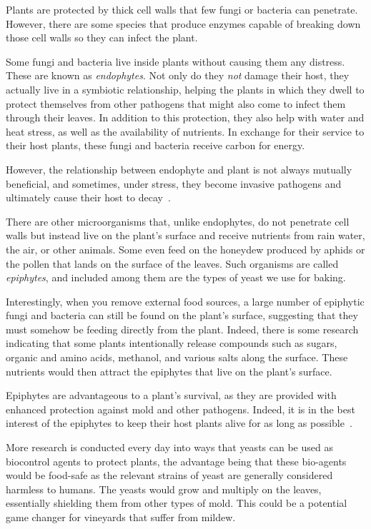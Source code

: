 Plants are protected by thick cell walls that few fungi or bacteria can
penetrate. However, there are some species that produce enzymes capable of
breaking down those cell walls so they can infect the plant.

Some fungi and bacteria live inside plants without causing them any distress.
These are known as \emph{endophytes}. Not only do they \emph{not} damage their
host, they actually live in a symbiotic relationship, helping the plants in
which they dwell to protect themselves from other pathogens that might also
come to infect them through their leaves. In addition to this protection, they
also help with water and heat stress, as well as the availability of nutrients.
In exchange for their service to their host plants, these fungi and bacteria
receive carbon for energy.

However, the relationship between endophyte and plant is not always mutually
beneficial, and sometimes, under stress, they become invasive pathogens and
ultimately cause their host to decay~\cite{endophytes+in+plants}.

There are other microorganisms that, unlike endophytes, do not penetrate cell
walls but instead live on the plant's surface and receive nutrients from rain
water, the air, or other animals. Some even feed on the honeydew produced by
aphids or the pollen that lands on the surface of the leaves. Such organisms
are called \emph{epiphytes}, and included among them are the types of yeast
we use for baking.

Interestingly, when you remove external food sources, a large number of
epiphytic fungi and bacteria can still be found on the plant's surface,
suggesting that they must somehow be feeding directly from the plant.
Indeed, there is some research indicating that some plants intentionally release
compounds such as sugars, organic and amino acids, methanol, and various
salts along the surface. These nutrients would then attract the epiphytes that
live on the plant's surface.

Epiphytes are advantageous to a plant's survival, as they are provided with
enhanced protection against mold and other pathogens. Indeed, it is in the
best interest of the epiphytes to keep their host plants alive for as long as
possible~\cite{leaf+surface+sugars+epiphytes}.

More research is conducted every day into ways that yeasts can be used as
biocontrol agents to protect plants, the advantage being that these bio-agents
would be food-safe as the relevant strains of yeast are generally considered
harmless to humans. The yeasts would grow and multiply on the leaves,
essentially shielding them from other types of mold. This could be a potential
game changer for vineyards that suffer from mildew.

